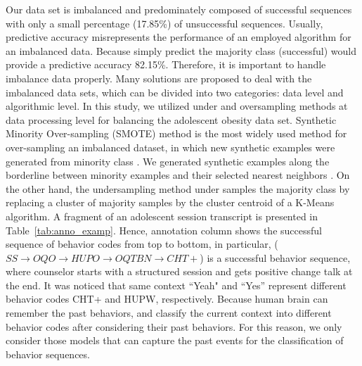 \documentclass{amia_summit_2018}
\begin{document}
Our data set is imbalanced and predominately composed of successful sequences with only a small percentage (17.85\%) of unsuccessful sequences. Usually, predictive accuracy misrepresents the performance of an employed algorithm for an imbalanced data. Because simply predict the majority class (successful) would provide a predictive accuracy 82.15\%. Therefore, it is important to handle imbalance data properly. Many solutions are proposed to deal with the imbalanced data sets, which can be divided into two categories: data level and algorithmic level. In this study, we utilized under and oversampling methods at data processing level for balancing the adolescent obesity data set. Synthetic Minority Over-sampling (SMOTE) method is the most widely used method for over-sampling an imbalanced dataset, in which new synthetic examples were generated from minority class \cite{chawla2002smote}. We generated synthetic examples along the borderline between minority examples and their selected nearest neighbors \cite{nguyen2011borderline}. On the other hand, the undersampling method under samples the majority class by replacing a cluster of majority samples by the cluster centroid of a K-Means algorithm.  A fragment of an adolescent session transcript is presented in Table~\ref{tab:anno_examp}. Hence, annotation column shows the successful sequence of behavior codes from top to bottom, in particular, ($SS\rightarrow OQO\rightarrow HUPO\rightarrow OQTBN\rightarrow CHT+$) is a successful behavior sequence, where counselor starts with a structured session and gets positive change talk at the end. It was noticed that same context ``Yeah" and ``Yes'' represent different behavior codes CHT+ and HUPW, respectively. Because human brain can remember the past behaviors, and classify the current context into different behavior codes after considering their past behaviors. For this reason, we only consider those models that can capture the past events for the classification of behavior sequences.\\
\end{document}

